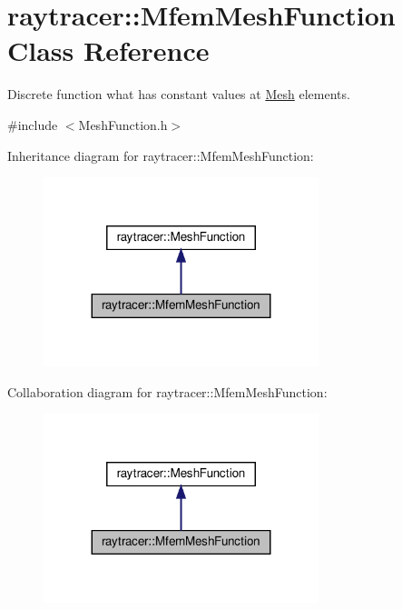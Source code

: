 \hypertarget{classraytracer_1_1MfemMeshFunction}{}\section{raytracer\+:\+:Mfem\+Mesh\+Function Class Reference}
\label{classraytracer_1_1MfemMeshFunction}


Discrete function what has constant values at \hyperlink{classraytracer_1_1Mesh}{Mesh} elements.  




{\ttfamily \#include $<$Mesh\+Function.\+h$>$}



Inheritance diagram for raytracer\+:\+:Mfem\+Mesh\+Function\+:
\nopagebreak
\begin{figure}[H]
\begin{center}
\leavevmode
\includegraphics[width=227pt]{classraytracer_1_1MfemMeshFunction__inherit__graph}
\end{center}
\end{figure}


Collaboration diagram for raytracer\+:\+:Mfem\+Mesh\+Function\+:
\nopagebreak
\begin{figure}[H]
\begin{center}
\leavevmode
\includegraphics[width=227pt]{classraytracer_1_1MfemMeshFunction__coll__graph}
\end{center}
\end{figure}
